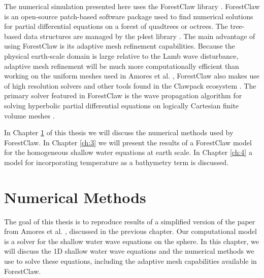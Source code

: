 \documentclass[twoside]{bsu-ms}
\newcommand{\fclaw}{ForestClaw\xspace}
\begin{document}
\indent The numerical simulation presented here uses the \fclaw library \cite{calhoun2017forestclaw}.
\fclaw is an open-source patch-based software package used to find numerical solutions for partial differential equations on a forest of quadtrees or octrees. The tree-based data structures are managed by the p4est library \cite{BursteddeWilcoxGhattas11}. The main advantage of using \fclaw is its adaptive mesh refinement capabilities.  Because the physical earth-scale domain is large relative to the Lamb wave disturbance, adaptive mesh refinement will be much more computationally efficient than working on the uniform meshes used in Amores et al. \cite{amores2022numerical},  \fclaw also makes use of high resolution solvers and other tools found in the Clawpack ecosystem \cite{mandli2016clawpack}. The primary solver featured in \fclaw is the wave propagation algorithm for solving hyperbolic partial differential equations on logically Cartesian finite volume meshes \cite{leveque2002finite}.

\indent In Chapter \ref{ch:2} of this thesis we will discuss the numerical methods used by \fclaw. In Chapter \ref{ch:3} we will present the results of a \fclaw model for the homogeneous shallow water equations at earth scale. In Chapter \ref{ch:4} a model for incorporating temperature as a bathymetry term is discussed.  


%
%

\chapter{Numerical Methods}\label{ch:2}
The goal of this thesis is to reproduce results of a simplified version of the paper from Amores et al. \cite{amores2022numerical}, discussed in the previous chapter. Our computational model is a solver for the shallow water wave equations on the sphere.  In this chapter, we will discuss the 1D shallow water wave equations and the numerical methods we use to solve these equations, including the adaptive mesh capabilities available in \fclaw.

\end{document}
